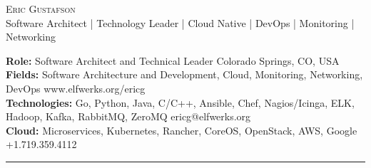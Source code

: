 \documentclass[10pt]{article}
\newcommand{\metasection}[2]
{
\footnotesize{#2} \hspace*{\fill} \footnotesize{#1}\\[1pt]
}
\begin{document}
\pagestyle{fancy}








\vspace{-8pt}
\begin{center}
	\HUGE \textsc{Eric Gustafson}
          \\[4pt]
	\small Software Architect | Technology Leader | Cloud Native | DevOps | Monitoring | Networking
\end{center}



\vspace{6pt}


\metasection{Colorado Springs, CO, USA}
            {\textbf{Role:} Software Architect and Technical Leader}
\metasection{www.elfwerks.org/ericg}
            {\textbf{Fields:} Software Architecture and Development,
              Cloud, Monitoring, Networking, DevOps}
\metasection{ericg@elfwerks.org}
            {\textbf{Technologies:} Go, Python, Java, C/C++, Ansible,
              Chef, Nagios/Icinga, ELK, Hadoop, Kafka, RabbitMQ, ZeroMQ}
\metasection{+1.719.359.4112}
            {\textbf{Cloud:} Microservices, Kubernetes, Rancher,
              CoreOS, OpenStack, AWS, Google}
\vspace{-2pt}
\textcolor{softcol}{\hrule}
\vspace{6pt}

\normalsize
\end{document}
